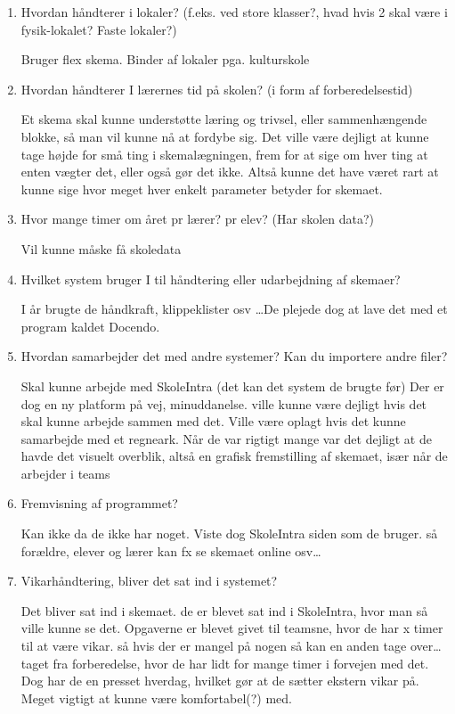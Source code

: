 \begin{enumerate}
	\item Hvordan håndterer i lokaler? (f.eks. ved store klasser?, hvad hvis 2 skal være i fysik-lokalet? Faste lokaler?)
	
	Bruger flex skema. Binder af lokaler pga. kulturskole
	
	\item Hvordan håndterer I lærernes tid på skolen? (i form af forberedelsestid)
	
	Et skema skal kunne understøtte læring og trivsel, eller sammenhængende blokke, så man vil kunne nå at fordybe sig. Det ville være dejligt at kunne tage højde for små ting i skemalægningen, frem for at sige om hver ting at enten vægter det, eller også gør det ikke. Altså kunne det have været rart at kunne sige hvor meget hver enkelt parameter betyder for skemaet. 
	
	\item Hvor mange timer om året pr lærer? pr elev? (Har skolen data?)
	
	Vil kunne måske få skoledata
	
	\item Hvilket system bruger I til håndtering eller udarbejdning af skemaer?

	I år brugte de håndkraft, klippeklister osv \ldots De plejede dog at lave det med et program kaldet Docendo. 
	
	\item Hvordan samarbejder det med andre systemer? Kan du importere andre filer?
	
	Skal kunne arbejde med SkoleIntra (det kan det system de brugte før) Der er dog en ny platform på vej, minuddanelse. ville kunne være dejligt hvis det skal kunne arbejde sammen med det. Ville være oplagt hvis det kunne samarbejde med et regneark. Når de var rigtigt mange var det dejligt at de havde det visuelt overblik, altså en grafisk fremstilling af skemaet, især når de arbejder i teams
	
	\item Fremvisning af programmet?
	
	Kan ikke da de ikke har noget. Viste dog SkoleIntra siden som de bruger. så forældre, elever og lærer kan fx se skemaet online osv\ldots 
	
	\item Vikarhåndtering, bliver det sat ind i systemet?
	
	Det bliver sat ind i skemaet. de er blevet sat ind i SkoleIntra, hvor man så ville kunne se det. Opgaverne er blevet givet til teamsne, hvor de har x timer til at være vikar. så hvis der er mangel på nogen så kan en anden tage over\ldots taget fra forberedelse, hvor de har lidt for mange timer i forvejen med det. Dog har de en presset hverdag, hvilket gør at de sætter ekstern vikar på. Meget vigtigt at kunne være komfortabel(?) med. 
	

\end{enumerate}
